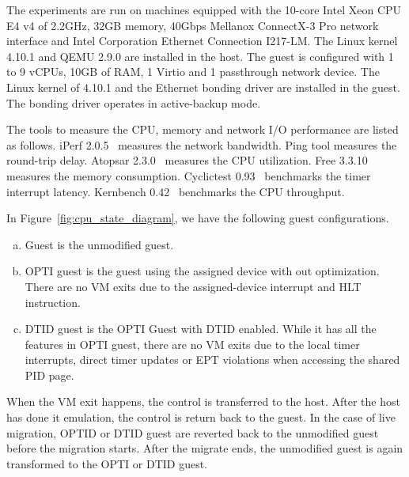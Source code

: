 
The experiments are run on machines equipped with the 10-core
Intel Xeon CPU E4 v4 of 2.2GHz, 32GB memory, 40Gbps Mellanox
ConnectX-3 Pro network interface and Intel Corporation
Ethernet Connection I217-LM. The Linux kernel 4.10.1 and QEMU
2.9.0 are installed in the host. The guest is configured with
1 to 9 vCPUs, 10GB of RAM, 1 Virtio and 1 passthrough network
device. The Linux kernel of 4.10.1 and the Ethernet bonding
driver are installed in the guest. The bonding driver operates
in active-backup mode.

The tools to measure the CPU, memory and network I/O
performance are listed as follows. iPerf 2.0.5~\cite{iperf}
measures the network bandwidth. Ping tool measures the
round-trip delay. Atopsar 2.3.0~\cite{atopsar} measures the
CPU utilization. Free 3.3.10~\cite{free} measures the memory
consumption. Cyclictest 0.93~\cite{cyclictest} benchmarks the
timer interrupt latency. Kernbench 0.42~\cite{kernbench}
benchmarks the CPU throughput.

In Figure~\ref{fig:cpu_state_diagram}, we have the following
guest configurations.
\begin{enumerate}[(a)]
  \item Guest is the unmodified guest.
  \item OPTI guest is the guest using the assigned device with
  out optimization. There are no VM exits due to the
  assigned-device interrupt and HLT instruction.
  \item DTID guest is the OPTI Guest with DTID enabled. While
  it has all the features in OPTI guest, there are no VM exits
  due to the local timer interrupts, direct timer updates or
  EPT violations when accessing the shared PID page.
\end{enumerate}
When the VM exit happens, the control is transferred to the
host. After the host has done it emulation, the control is
return back to the guest. In the case of live migration, OPTID
or DTID guest are reverted back to the unmodified guest before
the migration starts. After the migrate ends, the unmodified
guest is again transformed to the OPTI or DTID guest.
